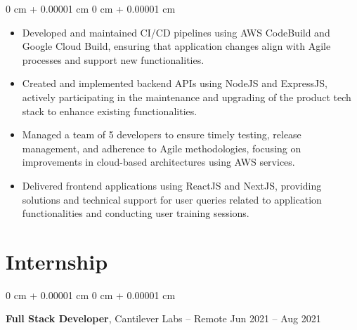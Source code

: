 \documentclass[10pt, letterpaper]{article}
\newenvironment{highlights}{
    \begin{itemize}[
        topsep=0.10 cm,
        parsep=0.10 cm,
        partopsep=0pt,
        itemsep=0pt,
        leftmargin=0 cm + 10pt
    ]
}{
    \end{itemize}
} %
\newenvironment{onecolentry}{
    \begin{adjustwidth}{
        0 cm + 0.00001 cm
    }{
        0 cm + 0.00001 cm
    }
}{
    \end{adjustwidth}
} %
\newenvironment{twocolentry}[2][]{
    \onecolentry
    \def\secondColumn{#2}
    \setcolumnwidth{\fill, 4.5 cm}
    \begin{paracol}{2}
}{
    \switchcolumn \raggedleft \secondColumn
    \end{paracol}
    \endonecolentry
} %
\begin{document}
        \vspace{0.10 cm}
        \begin{onecolentry}
            \begin{highlights}
                \item Developed and maintained CI/CD pipelines using AWS CodeBuild and Google Cloud Build, ensuring that application changes align with Agile processes and support new functionalities.
                \item Created and implemented backend APIs using NodeJS and ExpressJS, actively participating in the maintenance and upgrading of the product tech stack to enhance existing functionalities.
                \item Managed a team of 5 developers to ensure timely testing, release management, and adherence to Agile methodologies, focusing on improvements in cloud-based architectures using AWS services.
                \item Delivered frontend applications using ReactJS and NextJS, providing solutions and technical support for user queries related to application functionalities and conducting user training sessions.
            \end{highlights}
        \end{onecolentry}


        \vspace{0.2 cm}


    \section{Internship}



        
        \begin{twocolentry}{
            Jun 2021 – Aug 2021
        }
            \textbf{Full Stack Developer}, Cantilever Labs -- Remote\end{twocolentry}
\end{document}
